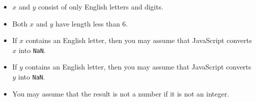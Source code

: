 \begin{itemize}
\tightlist
\item $x$ and $y$ consist of only English letters and digits.
\item Both $x$ and $y$ have length less than 6.
\item If $x$ contains an English letter, then you may assume that
JavaScript converts $x$ into \verb+NaN+.
\item If $y$ contains an English letter, then you may assume that 
JavaScript converts $y$ into \verb+NaN+.
\item You may assume that the result is not a number if it is not an integer.
\end{itemize}
